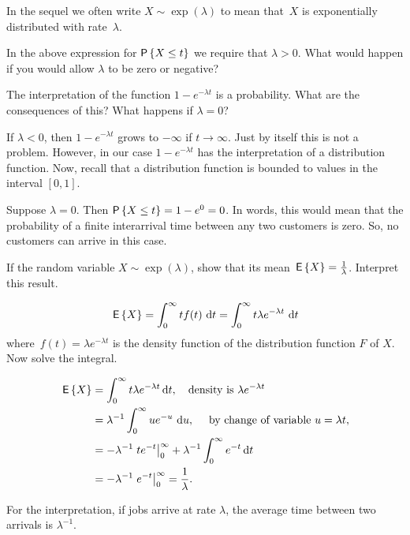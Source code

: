 In the sequel we often write $X\sim \exp(\lambda)$ to
mean that~$X$ is exponentially distributed with rate~$\lambda$.



\begin{exercise} 
In the above expression for $\P{X\leq t}$ we require that $\lambda>0$. What would happen if you would allow $\lambda$ to be zero or negative?
\begin{hint}
  The interpretation of the function $1-e^{-\lambda t}$ is a probability. What are the consequences of this? What happens if $\lambda=0$?
\end{hint}
\begin{solution}
  If $\lambda<0$, then $1-e^{-\lambda t}$ grows to $-\infty$ if $t\to \infty$. Just by itself this is not a problem. However, in our case $1-e^{-\lambda t}$ has the interpretation of a distribution function. Now, recall that a distribution function is bounded to values in the interval $[0,1]$.

Suppose $\lambda=0$. Then $\P{X\leq t} = 1-e^{0} = 0$. In words, this would mean that the probability of a finite interarrival time between any two customers is zero. So, no customers can arrive in this case. 
\end{solution}
\end{exercise}

\begin{exercise} \label{exer:lambda}
  If the random variable $X\sim\exp(\lambda)$, show that its mean $\,\mathsf{E}\left\{X\right\} = \frac{1}\lambda$. Interpret this result.
  \begin{hint}
 \begin{equation*}
    \,\mathsf{E}\left\{X\right\} = \int_0^\infty t f(t)\, \,\text{d}t =
    \int_0^\infty t \lambda e^{-\lambda t}\, \,\text{d}t 
  \end{equation*}
  where~$f(t)=\lambda e^{-\lambda t}$ is the density function of the distribution function $F$ of $X$. Now solve the integral.
  \end{hint}
  \begin{solution}
    \begin{equation*}
      \begin{split}
\,\mathsf{E}\left\{X\right\} 
&= \int_0^\infty t \lambda e^{-\lambda t} \,\text{d}t, \quad\text{density is } \lambda e^{-\lambda t} \\
&=   \lambda^{-1} \int_0^\infty u e^{-u}\, \,\text{d}u, \quad \text{ by  change of variable $u=\lambda t$},   \\
&=  -\lambda^{-1}\left. t e^{- t}\right|_0^\infty + \lambda^{-1} \int_0^\infty e^{- t} \,\text{d}t\\
&=  - \lambda^{-1} \left. e^{- t} \right|_0^\infty =  \frac1\lambda.
      \end{split}
    \end{equation*}

For the interpretation, if jobs arrive at rate $\lambda$, the average time between two arrivals is $\lambda^{-1}$.
  \end{solution}
\end{exercise}


